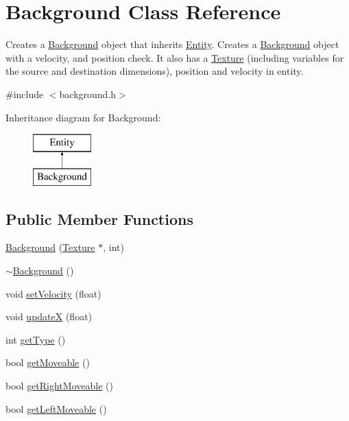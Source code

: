 \hypertarget{class_background}{\section{Background Class Reference}
\label{class_background}
}


Creates a \hyperlink{class_background}{Background} object that inherits \hyperlink{class_entity}{Entity}. Creates a \hyperlink{class_background}{Background} object with a velocity, and position check. It also has a \hyperlink{class_texture}{Texture} (including variables for the source and destination dimensions), position and velocity in entity.  




{\ttfamily \#include $<$background.\+h$>$}

Inheritance diagram for Background\+:\begin{figure}[H]
\begin{center}
\leavevmode
\includegraphics[height=2.000000cm]{class_background}
\end{center}
\end{figure}
\subsection*{Public Member Functions}
\begin{DoxyCompactItemize}
\item 
\hyperlink{class_background_a31d67c19cf5dd14c0f07b91e89c8b1f8}{Background} (\hyperlink{class_texture}{Texture} $\ast$, int)
\item 
\hyperlink{class_background_a36754df1deb720393217ade59da41557}{$\sim$\+Background} ()
\item 
void \hyperlink{class_background_a9b358e049be63be31b9241410288514f}{set\+Velocity} (float)
\item 
void \hyperlink{class_background_a1cb5afc5d8857ec4db6c6d393375a4c2}{update\+X} (float)
\item 
int \hyperlink{class_background_a25e0286050106340c34d91d3f1d0f4df}{get\+Type} ()
\item 
bool \hyperlink{class_background_a5f3e6259bb294391cf39d776456e7748}{get\+Moveable} ()
\item 
bool \hyperlink{class_background_a9e2c4dc2434c8123c1fabceecb53a7c0}{get\+Right\+Moveable} ()
\item 
bool \hyperlink{class_background_a6b49b6e383fed26938af98773f0952fa}{get\+Left\+Moveable} ()
\end{DoxyCompactItemize}
